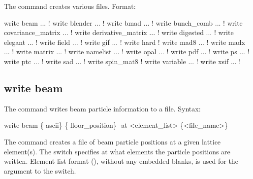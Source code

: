 {{{{{{{{{{{The  command creates various files.
Format:
\begin{example}
  write beam ...                  ! 
  write blender ...               ! 
  write bmad ...                  ! 
  write bunch_comb ...            ! 
  write covariance_matrix ...     ! 
  write derivative_matrix ...     ! 
  write digested ...              ! 
  write elegant ...               ! 
  write field ...                 ! 
  write gif ...                   ! 
  write hard                      ! 
  write mad8 ...                  ! 
  write madx ...                  ! 
  write matrix ...                ! 
  write namelist ...              ! 
  write opal ...                  ! 
  write pdf ...                   !   
  write ps ...                    !   
  write ptc ...                   ! 
  write sad ...                   ! 
  write spin_mat8                 ! 
  write variable ...              ! 
  write xsif ...                  ! 
\end{example}



\subsection{write beam}
\label{s:write.beam}

The  command writes beam particle information to a file.
Syntax:
\begin{example}
    write beam \{-ascii\} \{-floor_position\} -at <element_list> \{<file_name>\} 
\end{example}

The  command creates a file of beam particle positions at a given lattice element(s). The
 switch specifies at what elements the particle positions are written. Element list format
(), without any embedded blanks, is used for the 
argument to the  switch. 

}}}}}}}}}}}
